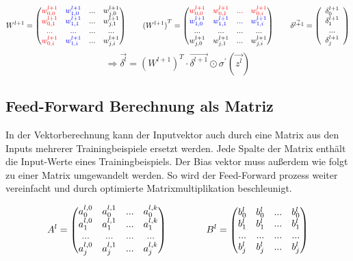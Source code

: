 \documentclass{article}
\begin{document}
\[ W^{l+1} = \begin{pmatrix}
    \textcolor{red}{w_{0,0}^{l+1}} & \textcolor{blue}{w_{1,0}^{l+1}} & ... & w_{j,0}^{l+1} \\
    \textcolor{red}{w_{0,1}^{l+1}} & \textcolor{blue}{w_{1,1}^{l+1}} & ... & w_{j,1}^{l+1} \\
    \textcolor{red}{...} & \textcolor{blue}{...} & ... & ... \\
    \textcolor{red}{w_{0,i}^{l+1}} & \textcolor{blue}{w_{1,i}^{l+1}} & ... & w_{j,i}^{l+1}
\end{pmatrix} 
\kern 20pt
{(W^{l+1})}^T = \begin{pmatrix}
    \textcolor{red}{w_{0,0}^{l+1}} & \textcolor{red}{w_{0,1}^{l+1}} & \textcolor{red}{...} & \textcolor{red}{w_{0,i}^{l+1}} \\
    \textcolor{blue}{w_{1,0}^{l+1}} & \textcolor{blue}{w_{1,1}^{l+1}} & \textcolor{blue}{...} & \textcolor{blue}{w_{1,i}^{l+1}} \\
    ... & ... & ... & ... \\
    w_{j,0}^{l+1} & w_{j,1}^{l+1} & ... & w_{j,i}^{l+1} 
\end{pmatrix} 
\kern 20pt
\vec{\delta^{l+1}} = \left( \begin{array}{c}
     \delta_0^{l+1} \\ \delta_1^{l+1} \\ ... \\ \delta_j^{l+1} 
\end{array} \right)\]
\[ \Rightarrow \vec{\delta^l} = {(W^{l+1})}^T \cdot \vec{\delta^{l+1}} \odot \sigma^{\prime}(\vec{z^l}) \]


 \subsection{Feed-Forward Berechnung als Matriz}
 In der Vektorberechnung kann der Inputvektor auch durch eine Matrix aus den Inputs mehrerer Trainingbeispiele ersetzt werden.
 Jede Spalte der Matrix enthält die Input-Werte eines Trainingbeispiels.
 Der Bias vektor muss außerdem wie folgt zu einer Matrix umgewandelt werden.
 So wird der Feed-Forward prozess weiter vereinfacht und durch optimierte Matrixmultiplikation beschleunigt.

 \[ A^l = 
 \begin{pmatrix}
    a_0^{l,0} & a_0^{l,1} & ... & a_0^{l,k} \\
    a_1^{l,0} & a_1^{l,1} & ... & a_1^{l,k} \\
    ... & ... & ... & ... \\
    a_j^{l,0} & a_j^{l,1} & ... & a_j^{l,k} \\
 \end{pmatrix}
 \kern 40pt
 B^l = 
  \begin{pmatrix}
    b_0^{l} & b_0^{l} & ... & b_0^{l} \\
    b_1^{l} & b_1^{l} & ... & b_1^{l} \\
    ... & ... & ... & ... \\
    b_j^{l} & b_j^{l} & ... & b_j^{l} \\
 \end{pmatrix} \]
\end{document}
